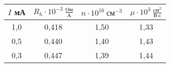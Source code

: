 \begin{table}[h!]
    \begin{center}
        \begin{tabular}{|c|c|c|c|}
            \hline
            $I$  мА & $R_h \cdot 10^{-3}  ~ \frac{\text{Ом}}{\text{А}}$ & $n \cdot 10^{16} ~ \text{см}^{-3}$ & $\mu \cdot 10^3 ~ \frac{\text{см}^2}{\text{В} \cdot \text{с}}$  \\ \hline
            1,0     & 0,418                                             & 1,50                               & 1,33                                                            \\ \hline
            0,5     & 0,440                                             & 1,40                               & 1,43                                                            \\ \hline
            0,3     & 0,447                                             & 1,39                               & 1,44                                                            \\ \hline                
        \end{tabular}
    \end{center}
    \caption{}
\end{table}